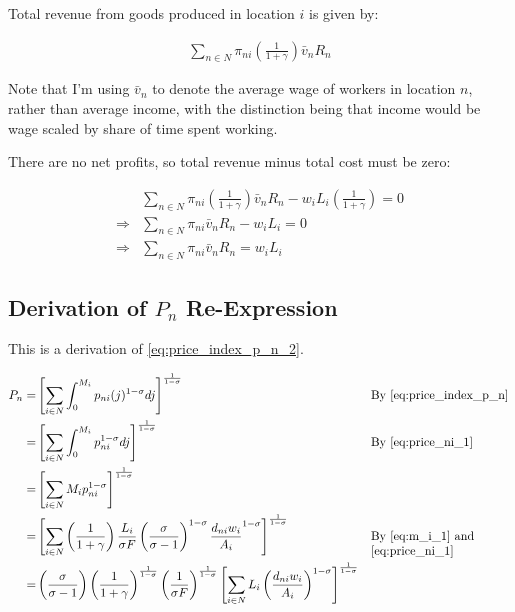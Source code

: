 \documentclass[10pt]{article}
\begin{document}
Total revenue from goods produced in location $i$ is given by:

\begin{align}
    \sum_{n \in N} \pi_{n i} \left(\frac{1}{1+\gamma}\right) \bar{v}_n R_n
\end{align}

Note that I'm using $\bar{v}_n$ to denote the average 
wage of workers in location $n$, rather than 
average income, with the distinction being that 
income would be wage scaled by share of time spent working.

There are no net profits, so 
total revenue minus total cost must be zero:

\begin{align}
    &\sum_{n \in N} \pi_{n i} \left(\frac{1}{1+\gamma}\right) \bar{v}_n R_n - w_i L_i \left(\frac{1}{1+\gamma}\right) = 0 \\
    \Rightarrow &\sum_{n \in N} \pi_{n i} \bar{v}_n R_n - w_i L_i = 0 \\
    \Rightarrow &\sum_{n \in N} \pi_{n i} \bar{v}_n R_n = w_i L_i
\end{align}


\subsection{Derivation of $P_n$ Re-Expression}
\label{sec:price_ni_2}

This is a derivation of \eqref{eq:price_index_p_n_2}.

\begin{align}
    P_n = &\left[\sum_{i \in N} \int_0^{M_i} p_{n i}(j)^{1-\sigma} d j\right]^{\frac{1}{1-\sigma}} && \parbox[t]{4cm}{\raggedright By \eqref{eq:price_index_p_n}} \\
    = &\left[\sum_{i \in N} \int_0^{M_i} p_{n i}^{1-\sigma} d j\right]^{\frac{1}{1-\sigma}} && \parbox[t]{4cm}{\raggedright By \eqref{eq:price_ni_1}} \\
    = &\left[\sum_{i \in N} M_i p_{n i}^{1-\sigma}\right]^{\frac{1}{1-\sigma}} \\
    = &\left[\sum_{i \in N} \left(\frac{1}{1 + \gamma}\right)\frac{L_i}{\sigma F} \left(\frac{\sigma}{\sigma-1}\right)^{1-\sigma} \frac{d_{ni} w_i}{A_i}^{1-\sigma}\right]^{\frac{1}{1-\sigma}} && \parbox[t]{4cm}{\raggedright By \eqref{eq:m_i_1} and \eqref{eq:price_ni_1}} \\
    = &\left(\frac{\sigma}{\sigma-1}\right) \left(\frac{1}{1 + \gamma}\right)^{\frac{1}{1 - \sigma}} \left(\frac{1}{\sigma F}\right)^{\frac{1}{1-\sigma}} \left[\sum_{i \in N} L_i \left(\frac{d_{ni} w_i}{A_i}\right)^{1-\sigma}\right]^{\frac{1}{1-\sigma}} \\
\end{align}
\end{document}
